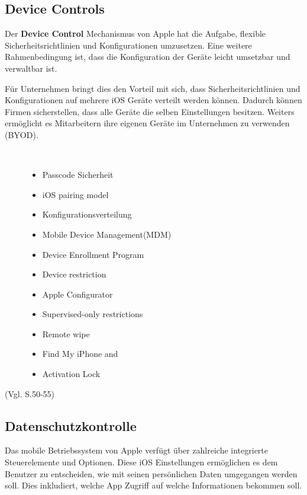 \subsection{Device Controls}
\label{sec:DeviceControl}

Der \textbf{Device Control} Mechanismus von Apple hat die Aufgabe, flexible Sicherheitsrichtlinien und Konfigurationen umzusetzen. Eine weitere Rahmenbedingung ist, dass die Konfiguration der Geräte leicht umsetzbar und verwaltbar ist.\par 
 Für Unternehmen bringt dies den Vorteil mit sich, dass Sicherheitsrichtlinien und Konfigurationen auf mehrere iOS Geräte verteilt werden können. Dadurch können Firmen sicherstellen, dass alle Geräte die selben Einstellungen besitzen. Weiters ermöglicht es Mitarbeitern ihre eigenen Geräte im Unternehmen zu verwenden (BYOD). 

\begin{description}
    \item[\parbox{\textwidth} {Dies sind die Mainfeature des Apple Device Control Service} ]~\par
    \begin{multicols}{2}
    \begin{itemize}
        \item Passcode Sicherheit
        \item iOS pairing model
        \item Konfigurationsverteilung
        \item Mobile Device Management(MDM)
        \item Device Enrollment Program
        \item Device restriction
        \item Apple Configurator
        \item Supervised-only restrictions
        \item Remote wipe
        \item Find My iPhone and 
        \item Activation Lock
    \end{itemize}
    \end{multicols}
\end{description}
(Vgl. \cite{Apple[4]} S.50-55)

\subsection{Datenschutzkontrolle}
\label{sec:PrivacyControls}
Das mobile Betriebssystem von Apple verfügt über zahlreiche integrierte Steuerelemente und Optionen. Diese iOS Einstellungen ermöglichen es dem Benutzer zu entscheiden, wie mit seinen persönlichen Daten umgegangen werden soll. Dies inkludiert, welche App Zugriff auf welche Informationen bekommen soll. 

